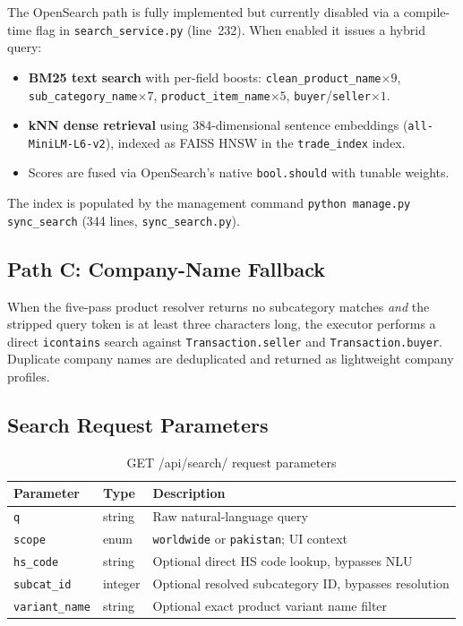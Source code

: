 \documentclass[12pt,a4paper]{article}
\begin{document}
The OpenSearch path is fully implemented but currently disabled via a compile-time flag
in \texttt{search\_service.py} (line~232).  When enabled it issues a hybrid query:

\begin{itemize}
  \item \textbf{BM25 text search} with per-field boosts:
        \texttt{clean\_product\_name}$\times 9$,
        \texttt{sub\_category\_name}$\times 7$,
        \texttt{product\_item\_name}$\times 5$,
        \texttt{buyer}/\texttt{seller}$\times 1$.
  \item \textbf{kNN dense retrieval} using 384-dimensional sentence embeddings
        (\texttt{all-MiniLM-L6-v2}), indexed as FAISS HNSW in the
        \texttt{trade\_index} index.
  \item Scores are fused via OpenSearch's native \texttt{bool.should} with
        tunable weights.
\end{itemize}

The index is populated by the management command
\texttt{python manage.py sync\_search} (344 lines, \texttt{sync\_search.py}).

\subsection{Path C: Company-Name Fallback}

When the five-pass product resolver returns no subcategory matches \emph{and} the
stripped query token is at least three characters long, the executor performs a direct
\texttt{icontains} search against \texttt{Transaction.seller} and
\texttt{Transaction.buyer}.  Duplicate company names are deduplicated and returned as
lightweight company profiles.

\subsection{Search Request Parameters}

\begin{table}[H]
\centering
\renewcommand{\arraystretch}{1.3}
\begin{tabularx}{\textwidth}{llX}
\toprule
\rowcolor{tableheader!20}
\textbf{Parameter} & \textbf{Type} & \textbf{Description} \\
\midrule
\texttt{q}            & string   & Raw natural-language query \\
\texttt{scope}        & enum     & \texttt{worldwide} or \texttt{pakistan}; UI context \\
\texttt{hs\_code}     & string   & Optional direct HS code lookup, bypasses NLU \\
\texttt{subcat\_id}   & integer  & Optional resolved subcategory ID, bypasses resolution \\
\texttt{variant\_name}& string   & Optional exact product variant name filter \\
\bottomrule
\end{tabularx}
\caption{GET /api/search/ request parameters}
\end{table}
\end{document}
